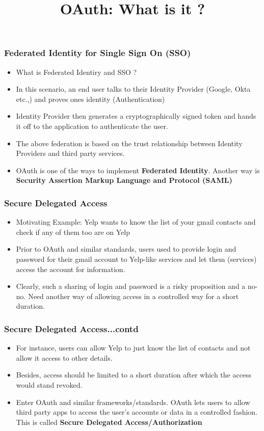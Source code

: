 \documentclass{beamer}
\title{OAuth: What is it ?}
\begin{document}
	
	\maketitle

	\begin{frame}
		\frametitle{Federated Identity for Single Sign On (SSO)}
		\begin{itemize}
			\setlength{\itemsep}{10pt}
			\item What is Federated Identiry and SSO ?
			\item In this scenario, an end user talks to their Identity Provider (Google, Okta etc.,) and proves ones identity (Authentication)
			\item Identity Provider then generates a cryptographically signed token and hands it off to the application to authenticate the user.
			\item The above federation is based on the trust relationship between Identity Providers and third party services.
			\item OAuth is one of the ways to implement \textbf{Federated Identity}. Another way is \textbf{Security Assertion Markup Language and Protocol (SAML)}
		\end{itemize}
	\end{frame}

	\begin{frame}
		\frametitle{Secure Delegated Access}
		\begin{itemize}
			\setlength{\itemsep}{20pt}
			\item Motivating Example: Yelp wants to know the list of your gmail contacts and check if any of them too are on Yelp
			\item Prior to OAuth and similar standards, users used to provide login and password for their gmail account to Yelp-like services and let them (services) access the account for information.
			\item Clearly, such a sharing of login and password is a risky proposition and a no-no. Need another way of allowing access in a controlled way for a short duration.
		\end{itemize}
	\end{frame}

	\begin{frame}
		\frametitle{Secure Delegated Access...contd}
		\begin{itemize}
			\setlength{\itemsep}{20pt}
			\item For instance, users can allow Yelp to just know the list of contacts and not allow it access to other details.
			\item Besides, access should be limited to a short duration after which the access would stand revoked.
			\item Enter OAuth and similar frameworks/standards. OAuth lets users to allow third party apps to access the user's accounts or data in a controlled fashion. This is called \textbf{Secure Delegated Access/Authorization}
		\end{itemize}
	\end{frame}
\end{document}
